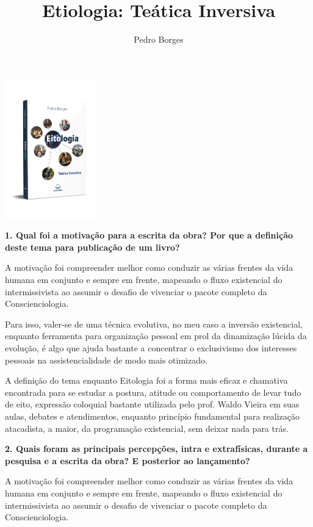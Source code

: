 \documentclass{gescons}
\author{Pedro Borges}
\title{Etiologia: Teática Inversiva}
\begin{document}
    \makeentrevistatitle

    \begin{multicols}{2}

\begin{center}
    \includegraphics[width=4cm]{articles/entrevista/mockups/Pedro_Borges.png}
\end{center}

\textbf{1.       Qual foi a motivação para a escrita da obra? Por que a definição deste tema para publicação de um livro?}

A motivação foi compreender melhor como conduzir as várias frentes da vida humana em conjunto e sempre em frente, mapeando o fluxo existencial do intermissivista ao assumir o desafio de vivenciar o pacote completo da Conscienciologia.

Para isso, valer-se de uma técnica evolutiva, no meu caso a inversão existencial, enquanto ferramenta para organização pessoal em prol da dinamização lúcida da evolução, é algo que ajuda bastante a concentrar o exclusivismo dos interesses pessoais na assistencialidade de modo mais otimizado.

A definição do tema enquanto Eitologia foi a forma mais eficaz e chamativa encontrada para se estudar a postura, atitude ou comportamento de levar tudo de eito, expressão coloquial bastante utilizada pelo prof. Waldo Vieira em suas aulas, debates e atendimentos, enquanto princípio fundamental para realização atacadista, a maior, da programação existencial, sem deixar nada para trás.

\textbf{2.       Quais foram as principais percepções, intra e extrafísicas, durante a pesquisa e a escrita da obra? E posterior ao lançamento?}

A motivação foi compreender melhor como conduzir as várias frentes da vida humana em conjunto e sempre em frente, mapeando o fluxo existencial do intermissivista ao assumir o desafio de vivenciar o pacote completo da Conscienciologia.


\end{multicols}
\end{document}
